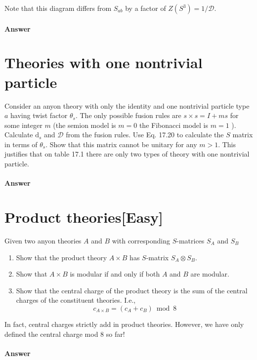 Note that this diagram differs from $S_{ab}$ by a factor of $Z(S^{3} )=1/\mathcal{D}$.

\paragraph{Answer}

\section{Theories with one nontrivial particle}
Consider an anyon theory with only the identity and one nontrivial particle type $a$ having twist factor $\theta _{s}$. The only possible fusion rules are $s\times s=I+ms$ for some integer $m$ (the semion model is $m=0$ the Fibonacci model is $m=1$ ). Calculate $\mathrm{d}_{s}$ and $\mathcal{D}$ from the fusion rules. Use Eq. 17.20 to calculate the $S$ matrix in terms of $\theta _{s}$. Show that this matrix cannot be unitary for any $m >1$. This justifies that on table 17.1 there are only two types of theory with one nontrivial particle.

\paragraph{Answer}

\section{Product theories[Easy]}
Given two anyon theories $A$ and $B$ with corresponding $S$-matrices $S_{A}$ and $S_{B}$
\begin{enumerate}
\item Show that the product theory $A\times B$ has $S$-matrix $S_{A} \otimes S_{B}$.
\item Show that $A\times B$ is modular if and only if both $A$ and $B$ are modular.
\item Show that the central charge of the product theory is the sum of the central charges of the constituent theories. I.e.,\begin{equation*}
c_{A\times B} =( c_{A} +c_{B})\bmod 8
\end{equation*}
\end{enumerate}

In fact, central charges strictly add in product theories. However, we have only defined the central charge mod 8 so far!

\paragraph{Answer}

